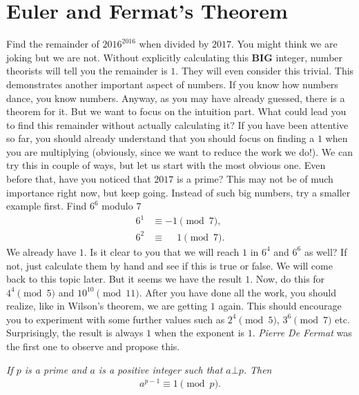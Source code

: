 \documentclass{subfile}
\begin{document}
	\section{Euler and Fermat's Theorem}
	Find the remainder of $2016^{2016}$ when divided by $2017$. You might think we are joking but we are not. Without explicitly calculating this \textbf{BIG} integer, number theorists will tell you the remainder is $1$. They will even consider this trivial. This demonstrates another important aspect of numbers. If you know how numbers dance, you know numbers. Anyway, as you may have already guessed, there is a theorem for it. But we want to focus on the intuition part. What could lead you to find this remainder without actually calculating it? If you have been attentive so far, you should already understand that you should focus on finding a $1$ when you are multiplying (obviously, since we want to reduce the work we do!). We can try this in couple of ways, but let us start with the most obvious one. Even before that, have you noticed that $2017$ is a prime? This may not be of much importance right now, but keep going. Instead of such big numbers, try a smaller example first. Find $6^6$ modulo $7$
		\begin{align*}
			6^1 & \equiv -1\pmod7,\\
			6^2 & \equiv \phantom{-}1\pmod7.
		\end{align*}
	We already have $1$. Is it clear to you that we will reach $1$ in $6^4$ and $6^6$ as well? If not, just calculate them by hand and see if this is true or false. We will come back to this topic later. But it seems we have the result $1$. Now, do this for $4^4\pmod5$ and $10^{10}\pmod{11}$. After you have done all the work, you should realize, like in Wilson's theorem, we are getting $1$ again. This should encourage you to experiment with some further values such as $2^4\pmod5$, $3^6\pmod7$ etc. Surprisingly, the result is always $1$ when the exponent is $1$. \textit{Pierre De Fermat} was the first one to observe and propose this.
		\begin{theorem}\slshape
			If $p$ is a prime and $a$ is a positive integer such that $a \bot p$. Then
			\begin{align*}
				a^{p-1} \equiv 1 \pmod p.
			\end{align*}
		\end{theorem}
\end{document}

